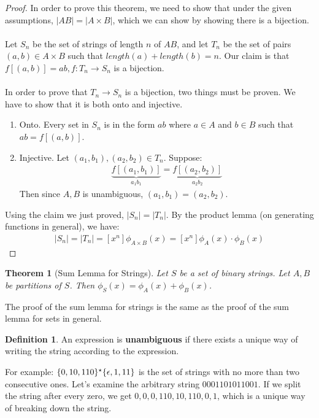 \documentclass[]{article}
\newtheorem*{theorem}{Theorem}
\theoremstyle{definition}
\newtheorem*{defn}{Definition}
\DeclarePairedDelimiter{\set}{\lbrace}{\rbrace}
\begin{document}
			\begin{proof}
				In order to prove this theorem, we need to show that under the given assumptions, $|AB| = |A \times B|$, which we can show by showing there is a bijection.
				\\ \\
				Let $S_n$ be the set of strings of length $n$ of $AB$, and let $T_n$ be the set of pairs $(a, b) \in A \times B$ such that $length(a) + length(b) = n$. Our claim is that $f[(a, b)] = ab, f : T_n \to S_n$ is a bijection. 
				\\ \\
				In order to prove that $T_n \to S_n$ is a bijection, two things must be proven. We have to show that it is both onto and injective.
				\begin{enumerate}
					\item Onto. Every set in $S_n$ is in the form $ab$ where $a \in A$ and $b \in B$ such that $ab = f[(a, b)]$.
					\item Injective. Let $(a_1, b_1), (a_2, b_2) \in T_n$. Suppose:
						\begin{align*}
							\underbrace{f[(a_1, b_1)]}_{a_1b_1} = \underbrace{f[(a_2, b_2)]}_{a_2b_2}
						\end{align*}
						Then since $A,B$ is unambiguous, $(a_1, b_1) = (a_2, b_2)$.
				\end{enumerate}

				Using the claim we just proved, $|S_n| = |T_n|$. By the product lemma (on generating functions in general), we have:
				\begin{align*}
					|S_n| = |T_n| = [x^n] \phi_{A \times B}(x) = [x^n] \phi_A(x) \cdot \phi_B(x)
				\end{align*}
			\end{proof}

			\begin{theorem}[Sum Lemma for Strings]
				Let $S$ be a set of binary strings. Let $A, B$ be partitions of $S$. Then $\phi_S(x) = \phi_A(x) + \phi_B(x)$.
			\end{theorem}

			The proof of the sum lemma for strings is the same as the proof of the sum lemma for sets in general.

			\begin{defn}
				An expression is \textbf{unambiguous} if there exists a unique way of writing the string according to the expression.
			\end{defn}

			For example: $\set{0, 10, 110}^\star \set{\epsilon, 1, 11}$ is the set of strings with no more than two consecutive ones. Let's examine the arbitrary string $0001101011001$. If we split the string after every zero, we get $0,0,0,110,10,110,0,1$, which is a unique way of breaking down the string.
\end{document}
